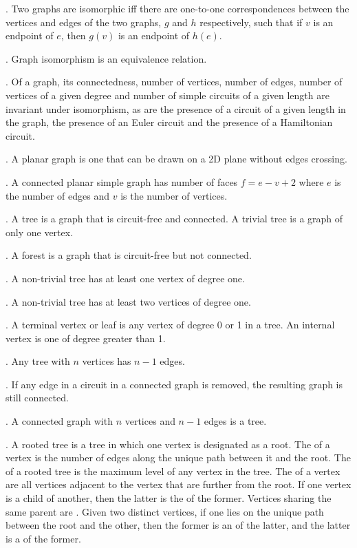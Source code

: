 \documentclass{slnotes}
\begin{document}
. Two graphs are isomorphic iff there are one-to-one correspondences between the vertices and edges of the two graphs, \(g\) and \(h\) respectively, such that if \(v\) is an endpoint of \(e\), then \(g(v)\) is an endpoint of \(h(e)\).

. Graph isomorphism is an equivalence relation.

. Of a graph, its connectedness, number of vertices, number of edges, number of vertices of a given degree and number of simple circuits of a given length are invariant under isomorphism, as are the presence of a circuit of a given length in the graph, the presence of an Euler circuit and the presence of a Hamiltonian circuit.

. A planar graph is one that can be drawn on a 2D plane without edges crossing.

. A connected planar simple graph has number of faces \(f = e - v + 2\) where \(e\) is the number of edges and \(v\) is the number of vertices.

. A tree is a graph that is circuit-free and connected. A trivial tree is a graph of only one vertex.

. A forest is a graph that is circuit-free but not connected.

. A non-trivial tree has at least one vertex of degree one.

. A non-trivial tree has at least two vertices of degree one.

. A terminal vertex or leaf is any vertex of degree 0 or 1 in a tree. An internal vertex is one of degree greater than 1.

. Any tree with \(n\) vertices has \(n-1\) edges.

. If any edge in a circuit in a connected graph is removed, the resulting graph is still connected.

. A connected graph with \(n\) vertices and \(n-1\) edges is a tree.

. A rooted tree is a tree in which one vertex is designated as a root. The  of a vertex is the number of edges along the unique path between it and the root. The  of a rooted tree is the maximum level of any vertex in the tree. The  of a vertex are all vertices adjacent to the vertex that are further from the root. If one vertex is a child of another, then the latter is the  of the former. Vertices sharing the same parent are . Given two distinct vertices, if one lies on the unique path between the root and the other, then the former is an  of the latter, and the latter is a  of the former.
\end{document}
